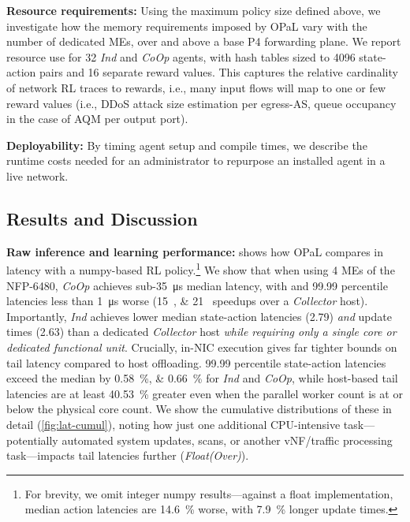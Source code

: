 \documentclass[
conference
,10pt
]{IEEEtran}
\newcommand{\fakepara}[1]{\noindent\textbf{#1:}}
\newcommand{\approachshort}{OPaL}
\newcommand{\Coopfw}{\emph{CoOp}}
\newcommand{\Indfw}{\emph{Ind}}
\begin{document}
\fakepara{Resource requirements}
Using the maximum policy size defined above, we investigate how the memory requirements imposed by \approachshort{} vary with the number of dedicated MEs, over and above a base P4 forwarding plane.
We report resource use for \SI{32}{\bit} \Indfw{} and \Coopfw{} agents, with hash tables sized to \num{4096} state-action pairs and \num{16} separate reward values.
This captures the relative cardinality of network RL traces to rewards, i.e., many input flows will map to one or few reward values (i.e., DDoS attack size estimation per egress-AS, queue occupancy in the case of AQM per output port).


\fakepara{Deployability}
By timing agent setup and compile times, we describe the runtime costs needed for an administrator to repurpose an installed agent in a live network.

\subsection{Results and Discussion}\label{sec:results}
\fakepara{Raw inference and learning performance}
 shows how \approachshort{} compares in latency with a numpy-based RL policy.\footnote{For brevity, we omit integer numpy results---against a float implementation, median action latencies are \SI{14.6}{\percent} worse, with \SI{7.9}{\percent} longer update times.}
We show that when using 4 MEs of the NFP-6480, \Coopfw{} achieves sub-\SI{35}{\micro\second} median latency, with  and \num{99.99} percentile latencies less than \SI{1}{\micro\second} worse (\SIlist{15;21}{\texttimes} speedups over a \emph{Collector} host).
Importantly, \Indfw{} achieves lower median state-action latencies (\SI{2.79}{\texttimes}) \emph{and} update times (\SI{2.63}{\texttimes}) than a dedicated \emph{Collector} host \emph{while requiring only a single core or dedicated functional unit}.
Crucially, in-NIC execution gives far tighter bounds on tail latency compared to host offloading.
\num{99.99} percentile state-action latencies exceed the median by \SIlist{0.58;0.66}{\percent} for \Indfw{} and \Coopfw{}, while host-based tail latencies are at least \SI{40.53}{\percent} greater even when the parallel worker count is at or below the physical core count.
We show the cumulative distributions of these in detail (\cref{fig:lat-cumul}), noting how just one additional CPU-intensive task---potentially automated system updates, scans, or another vNF/traffic processing task---impacts tail latencies further (\emph{Float(Over)}).
\end{document}
